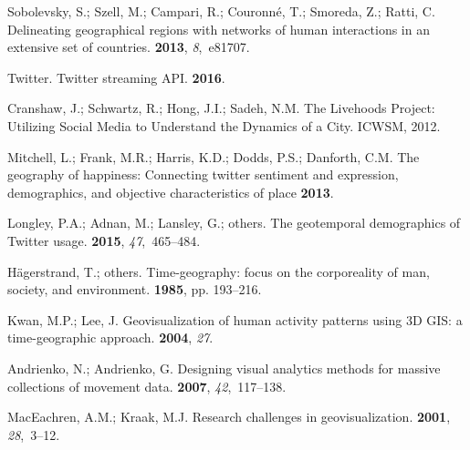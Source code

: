 \documentclass[ijgi,article,accept,moreauthors,pdftex,10pt,a4paper]{mdpi}
\theoremstyle{mdpi}
\newcounter{ex}
\newcounter{re}
\theoremstyle{mdpidefinition}
\begin{document}
\begin{thebibliography}{-------}
Sobolevsky, S.; Szell, M.; Campari, R.; Couronn{\'e}, T.; Smoreda, Z.; Ratti,
  C.
\newblock Delineating geographical regions with networks of human interactions
  in an extensive set of countries.
 {\bf 2013}, {\em 8},~e81707.

Twitter.
\newblock Twitter streaming API.
 {\bf
  2016}.

Cranshaw, J.; Schwartz, R.; Hong, J.I.; Sadeh, N.M.
\newblock The Livehoods Project: Utilizing Social Media to Understand the
  Dynamics of a City.
\newblock  ICWSM,  2012.

Mitchell, L.; Frank, M.R.; Harris, K.D.; Dodds, P.S.; Danforth, C.M.
\newblock The geography of happiness: Connecting twitter sentiment and
  expression, demographics, and objective characteristics of place {\bf 2013}.

Longley, P.A.; Adnan, M.; Lansley, G.; others.
\newblock The geotemporal demographics of Twitter usage.
 {\bf 2015}, {\em 47},~465--484.

H{\"a}gerstrand, T.; others.
\newblock Time-geography: focus on the corporeality of man, society, and
  environment.
 {\bf 1985}, pp. 193--216.

Kwan, M.P.; Lee, J.
\newblock Geovisualization of human activity patterns using 3D GIS: a
  time-geographic approach.
 {\bf 2004}, {\em 27}.

Andrienko, N.; Andrienko, G.
\newblock Designing visual analytics methods for massive collections of
  movement data.
 {\bf 2007}, {\em 42},~117--138.

MacEachren, A.M.; Kraak, M.J.
\newblock Research challenges in geovisualization.
 {\bf 2001}, {\em
  28},~3--12.


\end{thebibliography}
\end{document}
